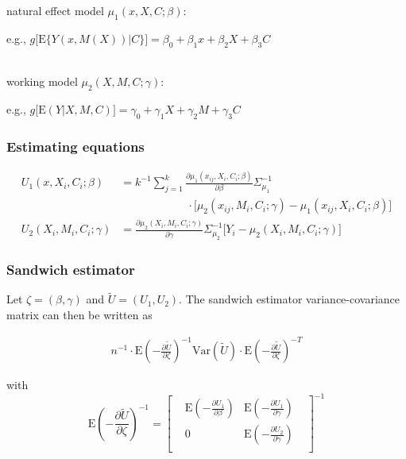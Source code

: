\documentclass[]{article}
\begin{document}
natural effect model $\mu_1(x,X,C;\beta)$:
\begin{flushright} e.g., $g\big[\textrm{E}\{Y(x,M(X))\vert C\}\big] = \beta_0 + \beta_1 x + \beta_2 X + \beta_3 C$ \end{flushright}\\[1em]
working model $\mu_2(X,M,C;\gamma)$:
\begin{flushright} e.g., $g\big[\textrm{E}(Y\vert X,M,C)\big] = \gamma_0 + \gamma_1 X + \gamma_2 M + \gamma_3 C$ \end{flushright}

\subsubsection*{Estimating equations}

\begin{align*}
\displaystyle U_{1}(x,X_i,C_i;\beta) &= k^{-1} \sum_{j=1}^{k} \frac{\partial \mu_1(x_{ij},X_i,C_i;\beta)}{\partial \beta} \Sigma_{\mu_1}^{-1}\\[-0.6em] & \qquad \qquad \qquad \cdot \big[ \mu_2(x_{ij},M_i,C_i;\gamma) - \mu_1(x_{ij},X_i,C_i;\beta) \big]\\[1em]
\displaystyle U_{2}(X_i,M_i,C_i;\gamma) &= \frac{\partial \mu_2(X_i,M_i,C_i;\gamma)}{\partial \gamma} \Sigma_{\mu_2}^{-1} \big[ Y_i - \mu_2(X_i,M_i,C_i;\gamma) \big]
\end{align*}

\subsubsection*{Sandwich estimator}

Let $\zeta = (\beta, \gamma)$ and $\tilde U = (U_1, U_2)$. The sandwich estimator variance-covariance matrix can then be written as

\begin{eqnarray*}
\displaystyle n^{-1}\cdot\mbox{E}\left(-\frac{\partial \tilde U}{\partial \zeta}\right)^{-1} \mbox{Var}(\tilde U) \cdot \mbox{E}\left(-\frac{\partial \tilde U}{\partial \zeta}\right)^{-T}
\end{eqnarray*}

\noindent with 
\[
\renewcommand\arraystretch{2.5}
\displaystyle \mbox{E}\left(-\frac{\partial \tilde U}{\partial \zeta}\right)^{-1} = 
\begin{bmatrix}
& \displaystyle\mbox{E}\left(-\frac{\partial U_1}{\partial \beta}\right) & \displaystyle\mbox{E}\left(-\frac{\partial U_1}{\partial \gamma}\right) &\\
& 0 & \displaystyle\mbox{E}\left(-\frac{\partial U_2}{\partial \gamma}\right) &\\
\end{bmatrix}^{-1}
\]
\end{document}
